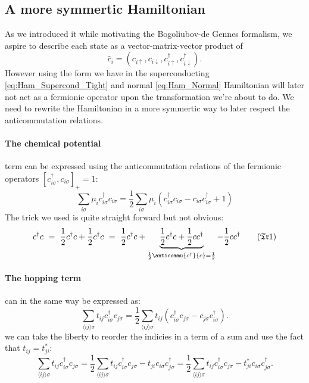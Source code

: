 \documentclass[../main.tex]{subfile}
\begin{document}
\subsection{A more symmertic Hamiltonian}
As we introduced it while motivating the Bogoliubov-de Gennes formalism, we aspire to describe each state as a vector-matrix-vector product of
\[
    \hat{c}_i = \left(c_{i\uparrow}, c_{i\downarrow},c_{i\uparrow}^{\dagger}, c_{i\downarrow}^{\dagger}\right).
\]
However using the form we have in the superconducting \ref{eq:Ham_Supercond_Tight} and normal \ref{eq:Ham_Normal} 
Hamiltonian will later not act as a fermionic operator upon the transformation we're about to
do. We need to rewrite the Hamiltonian in a more symmertic way to later respect the anticommutation relations.\\

\paragraph{The chemical potential} term can be expressed using the anticommutation relations of the fermionic operators $[c_{i\sigma}^{\dagger},c_{i\sigma}]_+ = 1$:
\begin{equation}\label{eq:SymHam_muTerm}
    \sum_{i\sigma} \mu_i c_{i\sigma}^{\dagger} c_{i\sigma} = \frac{1}{2}\sum_{i\sigma} \mu_i \left(c_{i\sigma}^{\dagger}c_{i\sigma} - c_{i\sigma}c_{i\sigma}^{\dagger} + 1\right)
\end{equation}
The trick we used is quite straight forward but not obvious: 
\[
    c^{\dagger}c ~=~ \frac{1}{2}c^{\dagger}c + \frac{1}{2}c^{\dagger}c ~=~ \frac{1}{2}c^{\dagger}c + \underbrace{\frac{1}{2}c^{\dagger}c + \frac{1}{2}cc^{\dagger}}_{\frac{1}{2}\anticommu{c^{\dagger}}{c} = \frac{1}{2}} - \frac{1}{2}cc^{\dagger} \tag{$\mathfrak{Tr}$1} \label{eq:Trick1}
\]
\paragraph{The hopping term} can in the same way be expressed as:
\[
    \sum_{\langle ij\rangle\sigma} t_{ij} c_{i\sigma}^{\dagger} c_{j\sigma} = \frac{1}{2}\sum_{\langle ij\rangle \sigma} t_{ij} \left(c_{i\sigma}^{\dagger}c_{j\sigma} - c_{j\sigma}c_{i\sigma}^{\dagger}\right).
\]
we can take the liberty to reorder the indicies in a term of a sum and use the fact that $t_{ij} = t_{ji}^{\ast}$:
\begin{equation}\label{eq:SymHam_tij}
    \sum_{\langle ij\rangle\sigma} t_{ij} c_{i\sigma}^{\dagger} c_{j\sigma} = \frac{1}{2}\sum_{\langle ij\rangle \sigma} t_{ij}c_{i\sigma}^{\dagger}c_{j\sigma} - t_{ji}c_{i\sigma}c_{j\sigma}^{\dagger} = \frac{1}{2}\sum_{\langle ij\rangle \sigma} t_{ij}c_{i\sigma}^{\dagger}c_{j\sigma} - t_{ji}^{\ast}c_{i\sigma}c_{j\sigma}^{\dagger}.
\end{equation}
\end{document}
